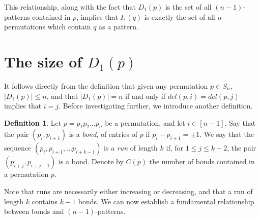 \documentclass[11pt]{article}
\theoremstyle{plain}
\theoremstyle{definition}
\newtheorem{defn}[thm]{Definition}
\begin{document}
  This relationship, along with the fact that $D_1(p)$ is the set of all
  $(n-1)$-patterns contained in $p$, implies that $I_1(q)$ is exactly the set of all
  $n$-permutations which contain $q$ as a pattern. 




\section{The size of $D_1(p)$}

  It follows directly from the definition that given any permutation $ p \in S_n$,
  $|D_1(p)| \leq n$, and that $|D_1(p)| = n$ if and only if $del(p,i) = del(p,j)$
  implies that $i = j$. Before investigating further, we introduce another
  definition.

  \begin{defn} 
  Let $p = p_1p_2 \ldots p_n$ be a permutation, and let $i \in [n-1]$. Say that
  the pair $(p_i, p_{i+1})$ is a \emph{bond}, of entries of $p$ if $p_i - p_{i+1}
  = \pm1$. We say that the sequence $(p_i, p_{i+1}, \ldots p_{i+k-1})$ is a
  \emph{run} of length $k$ if, for $1 \leq j \leq k-2$, the pair
  $(p_{i+j},p_{i+j+1})$ is a bond. Denote by $C(p)$ the number of bonds contained
  in a permutation $p$. 
  \end{defn}

  Note that runs are necessarily either increasing or decreasing, and that a run
  of length $k$ contains $k-1$ bonds. We can now establish a fundamental
  relationship between bonds and $(n-1)$-patterns. 
\end{document}
